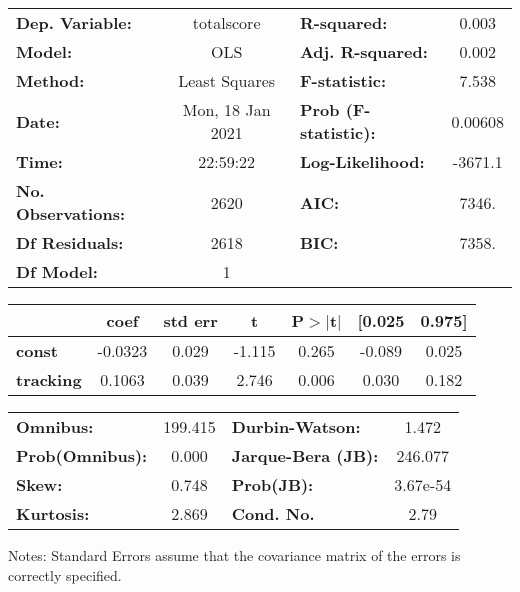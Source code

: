 \begin{center}
\begin{tabular}{lclc}
\toprule
\textbf{Dep. Variable:}    &    totalscore    & \textbf{  R-squared:         } &     0.003   \\
\textbf{Model:}            &       OLS        & \textbf{  Adj. R-squared:    } &     0.002   \\
\textbf{Method:}           &  Least Squares   & \textbf{  F-statistic:       } &     7.538   \\
\textbf{Date:}             & Mon, 18 Jan 2021 & \textbf{  Prob (F-statistic):} &  0.00608    \\
\textbf{Time:}             &     22:59:22     & \textbf{  Log-Likelihood:    } &   -3671.1   \\
\textbf{No. Observations:} &        2620      & \textbf{  AIC:               } &     7346.   \\
\textbf{Df Residuals:}     &        2618      & \textbf{  BIC:               } &     7358.   \\
\textbf{Df Model:}         &           1      & \textbf{                     } &             \\
\bottomrule
\end{tabular}
\begin{tabular}{lcccccc}
                  & \textbf{coef} & \textbf{std err} & \textbf{t} & \textbf{P$> |$t$|$} & \textbf{[0.025} & \textbf{0.975]}  \\
\midrule
\textbf{const}    &      -0.0323  &        0.029     &    -1.115  &         0.265        &       -0.089    &        0.025     \\
\textbf{tracking} &       0.1063  &        0.039     &     2.746  &         0.006        &        0.030    &        0.182     \\
\bottomrule
\end{tabular}
\begin{tabular}{lclc}
\textbf{Omnibus:}       & 199.415 & \textbf{  Durbin-Watson:     } &    1.472  \\
\textbf{Prob(Omnibus):} &   0.000 & \textbf{  Jarque-Bera (JB):  } &  246.077  \\
\textbf{Skew:}          &   0.748 & \textbf{  Prob(JB):          } & 3.67e-54  \\
\textbf{Kurtosis:}      &   2.869 & \textbf{  Cond. No.          } &     2.79  \\
\bottomrule
\end{tabular}
\end{center}

Notes: \newline
 [1] Standard Errors assume that the covariance matrix of the errors is correctly specified.
